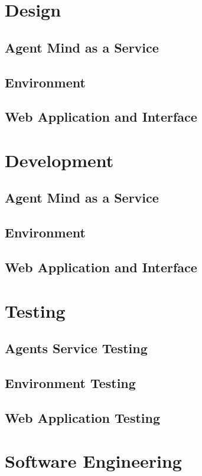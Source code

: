 \documentclass[]{final_report}
\begin{document}
\section{Design}

\subsection{Agent Mind as a Service}
\subsection{Environment}
\subsection{Web Application and Interface}

\section{Development}

\subsection{Agent Mind as a Service}
\subsection{Environment}
\subsection{Web Application and Interface}

\section{Testing}

\subsection{Agents Service Testing}
\subsection{Environment Testing}
\subsection{Web Application Testing}

\section{Software Engineering}
\end{document}
